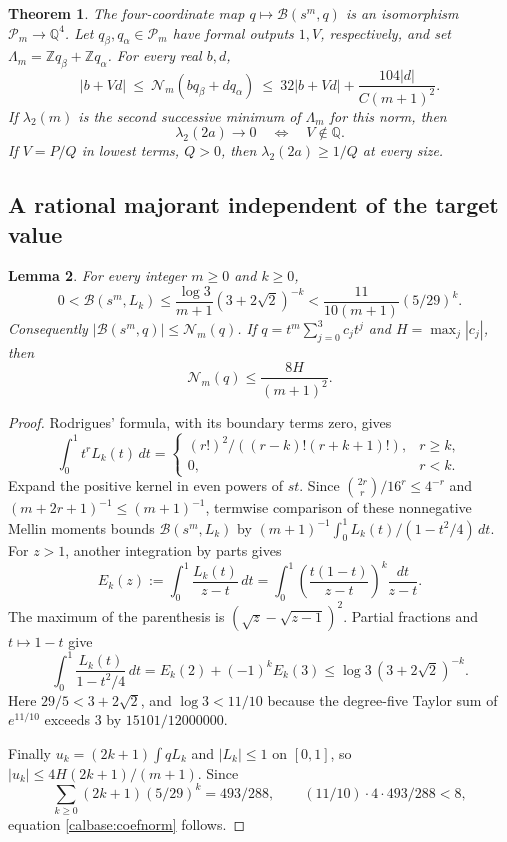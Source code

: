 \documentclass[11pt,a4paper]{article}
\numberwithin{equation}{section}
\newtheorem{theorem}{Theorem}[section]
\newtheorem{lemma}[theorem]{Lemma}
\theoremstyle{definition}\newtheorem{definition}[theorem]{Definition}
\theoremstyle{remark}\newtheorem{remark}[theorem]{Remark}
\newcommand{\B}{\mathcal B}\newcommand{\N}{\mathcal N}\newcommand{\M}{\mathcal M}
\begin{document}
\begin{theorem}\label{calbase:main}
The four-coordinate map $q\mapsto\B(s^m,q)$ is an isomorphism
$\mathcal P_m\longrightarrow\mathbb Q^4$.
Let $q_\beta,q_\alpha\in\mathcal P_m$ have formal outputs $1,V$,
respectively, and set
$\Lambda_m=\mathbb Zq_\beta+\mathbb Zq_\alpha$.
For every real $b,d$,
\begin{equation}
 |b+Vd|\ \le\ \N_m(bq_\beta+dq_\alpha)
 \ \le\ 32|b+Vd|+\frac{104|d|}{C(m+1)^2}.
 \label{calbase:calibration}
\end{equation}
If $\lambda_2(m)$ is the second successive minimum of $\Lambda_m$
for this norm, then
\[
 \lambda_2(2a)\longrightarrow0
 \quad\Longleftrightarrow\quad V\notin\mathbb Q.
\]
If $V=P/Q$ in lowest terms, $Q>0$, then
$\lambda_2(2a)\ge1/Q$ at every size.
\end{theorem}

\subsection{A rational majorant independent of the target value}
\begin{lemma}\label{calbase:majorant}
For every integer $m\ge0$ and $k\ge0$,
\[
 0<\B(s^m,L_k)\le\frac{\log3}{m+1}(3+2\sqrt2)^{-k}
 <\frac{11}{10(m+1)}(5/29)^k.
\]
Consequently $|\B(s^m,q)|\le\N_m(q)$. If
$q=t^m\sum_{j=0}^3c_jt^j$ and $H=\max_j|c_j|$, then
\begin{equation}\label{calbase:coefnorm}
 \N_m(q)\le\frac{8H}{(m+1)^2}.
\end{equation}
\end{lemma}
\begin{proof}
Rodrigues' formula, with its boundary terms zero, gives
\[
 \int_0^1t^rL_k(t)\,dt=
 \begin{cases}(r!)^2/((r-k)!(r+k+1)!),&r\ge k,\\0,&r<k.
 \end{cases}
\]
Expand the positive kernel in even powers of $st$. Since
$\binom{2r}r/16^r\le4^{-r}$ and $(m+2r+1)^{-1}\le(m+1)^{-1}$,
termwise comparison of these nonnegative Mellin moments bounds
$\B(s^m,L_k)$ by $(m+1)^{-1}\int_0^1L_k(t)/(1-t^2/4)\,dt$.
For $z>1$, another integration by parts gives
\[
 E_k(z):=\int_0^1\frac{L_k(t)}{z-t}\,dt
 =\int_0^1\left(\frac{t(1-t)}{z-t}\right)^k\frac{dt}{z-t}.
\]
The maximum of the parenthesis is
$(\sqrt z-\sqrt{z-1})^2$. Partial fractions and $t\mapsto1-t$
give
\[
 \int_0^1\frac{L_k(t)}{1-t^2/4}\,dt
 =E_k(2)+(-1)^kE_k(3)
 \le\log3\,(3+2\sqrt2)^{-k}.
\]
Here $29/5<3+2\sqrt2$, and $\log3<11/10$ because the
degree-five Taylor sum of $e^{11/10}$ exceeds $3$ by
$15101/12000000$.

Finally $u_k=(2k+1)\int qL_k$ and $|L_k|\le1$ on $[0,1]$,
so $|u_k|\le4H(2k+1)/(m+1)$. Since
\[
 \sum_{k\ge0}(2k+1)(5/29)^k=493/288,
 \qquad (11/10)\cdot4\cdot493/288<8,
\]
equation \eqref{calbase:coefnorm} follows.
\end{proof}
\end{document}
